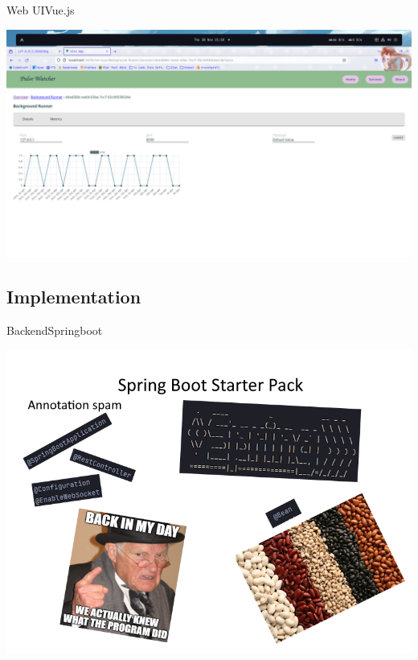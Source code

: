 \documentclass{beamer}
\begin{document}
\begin{frame}{Web UI}{Vue.js}

\includegraphics[width=\linewidth,keepaspectratio]{web_ui_3.png}

\end{frame}

\subsection{Implementation}

\begin{frame}{Backend}{Springboot}

\includegraphics[width=\linewidth,keepaspectratio]{spring_boot_meme.png}


\end{frame}
\end{document}
